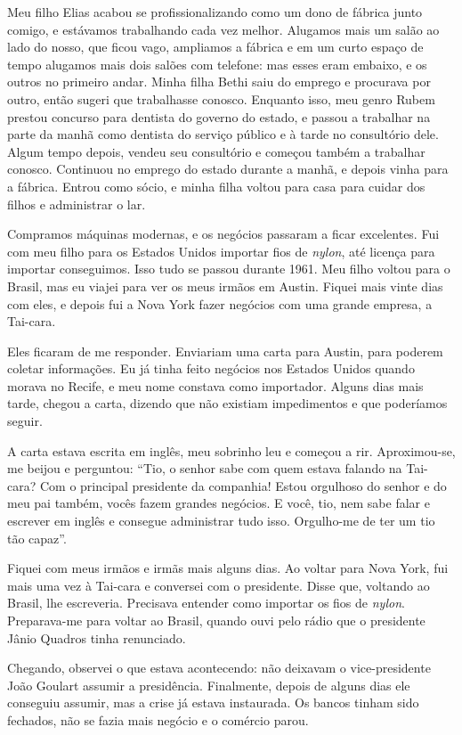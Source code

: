 Meu filho Elias acabou se profissionalizando como um dono de fábrica junto comigo, e
estávamos trabalhando cada vez melhor. Alugamos mais um salão ao lado do
nosso, que ficou vago, ampliamos a fábrica e em um curto espaço de
tempo alugamos mais dois salões com telefone: mas esses eram
embaixo, e os outros no primeiro andar. Minha filha Bethi saiu do
emprego e procurava por outro, então sugeri que trabalhasse
conosco. Enquanto isso, meu genro Rubem prestou concurso para dentista do governo do
estado, e passou a trabalhar na parte da manhã como dentista do serviço
público e à tarde no consultório dele. Algum tempo depois, vendeu seu
consultório e começou também a trabalhar conosco. Continuou
no emprego do estado durante a manhã, e depois vinha para a fábrica. Entrou 
como sócio, e minha filha voltou para casa para cuidar dos filhos e
administrar o lar.

Compramos máquinas modernas, e os negócios passaram a ficar excelentes. Fui com
meu filho para os Estados Unidos importar fios de \textit{nylon}, até
licença para importar conseguimos. Isso tudo se passou durante 1961. 
Meu filho voltou para o Brasil, mas eu viajei para ver os
meus irmãos em Austin. Fiquei mais vinte dias com eles, e depois fui a
Nova York fazer negócios com uma grande empresa, a Tai-cara.

Eles ficaram de me responder. Enviariam uma carta para Austin, para poderem 
coletar informações. Eu já tinha feito negócios nos Estados
Unidos quando morava no Recife, e meu nome constava como importador.
Alguns dias mais tarde, chegou a carta, dizendo que não
existiam impedimentos e que poderíamos seguir. 

A carta estava
escrita em inglês, meu sobrinho leu e começou a rir. Aproximou-se, me
beijou e perguntou: ``Tio, o senhor sabe com quem estava falando na Tai-cara? Com
o principal presidente da companhia! Estou orgulhoso do senhor e do
meu pai também, vocês fazem grandes negócios. E você, tio, nem sabe
falar e escrever em inglês e consegue administrar tudo isso. Orgulho-me
de ter um tio tão capaz''.

Fiquei com meus irmãos e irmãs mais alguns dias. Ao voltar para Nova York, 
fui mais uma vez à Tai-cara e conversei com o presidente. Disse que,  
voltando ao Brasil, lhe escreveria. Precisava entender como importar os fios de \textit{nylon}. Preparava-me para voltar ao Brasil, quando ouvi pelo rádio que o presidente Jânio
Quadros tinha renunciado.

Chegando, observei o que estava acontecendo: não
deixavam o vice-presidente João Goulart assumir a presidência. 
Finalmente, depois de alguns dias ele conseguiu assumir, mas a crise já estava instaurada. Os bancos tinham sido fechados, não se fazia mais negócio e o comércio parou.

